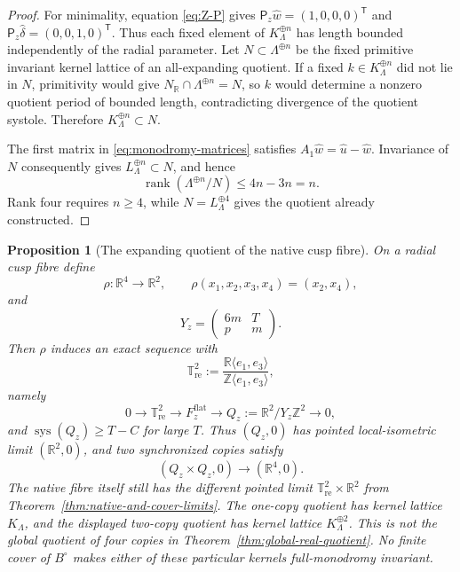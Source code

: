\documentclass[11pt]{article}
\numberwithin{equation}{section}
\newtheorem{proposition}[theorem]{Proposition}
\theoremstyle{definition}
\theoremstyle{remark}
\newcommand{\R}{\mathbb R}
\newcommand{\Z}{\mathbb Z}
\newcommand{\T}{\mathbb T}
\begin{document}
\begin{proof}
For minimality, equation \eqref{eq:Z-P} gives
$\mathsf P_z\widehat w=(1,0,0,0)^{\mathsf T}$ and
$\mathsf P_z\widehat\delta=(0,0,1,0)^{\mathsf T}$.  Thus each fixed element
of $K_\Lambda^{\oplus n}$ has length bounded independently of the radial
parameter.  Let $N\subset\Lambda^{\oplus n}$ be the fixed primitive invariant
kernel lattice of an all-expanding quotient.  If a fixed
$k\in K_\Lambda^{\oplus n}$ did not lie in $N$, primitivity would give
$N_\R\cap\Lambda^{\oplus n}=N$, so $k$ would determine a nonzero quotient
period of bounded length, contradicting divergence of the quotient systole.
Therefore $K_\Lambda^{\oplus n}\subset N$.

The first matrix in \eqref{eq:monodromy-matrices} satisfies
$A_1\widehat w=\widehat u-\widehat w$.  Invariance of $N$ consequently gives
$L_\Lambda^{\oplus n}\subset N$, and hence
\[
 \operatorname{rank}(\Lambda^{\oplus n}/N)
 \le 4n-3n=n.
\]
Rank four requires $n\ge4$, while
$N=L_\Lambda^{\oplus4}$ gives the quotient already constructed.
\end{proof}

\begin{proposition}[The expanding quotient of the native cusp fibre]
\label{prop:native-cusp-quotient}
On a radial cusp fibre define
\[
 \rho:\R^4\longrightarrow\R^2,
 \qquad \rho(x_1,x_2,x_3,x_4)=(x_2,x_4),
\]
and
\begin{equation}\label{eq:native-long-matrix}
 Y_z=\begin{pmatrix}6m&T\\p&m\end{pmatrix}.
\end{equation}
Then $\rho$ induces an exact sequence
with
\[
 \T^2_{\mathrm{re}}
 :=\frac{\R\langle e_1,e_3\rangle}{\Z\langle e_1,e_3\rangle},
\]
namely
\begin{equation}\label{eq:native-cusp-exact-sequence}
 0\longrightarrow\T^2_{\mathrm{re}}\longrightarrow
 F_z^{\mathrm{flat}}\longrightarrow
 Q_z:=\R^2/Y_z\Z^2\longrightarrow0,
\end{equation}
and $\operatorname{sys}(Q_z)\ge T-C$ for large $T$.  Thus $(Q_z,0)$ has
pointed local-isometric limit $(\R^2,0)$, and two synchronized copies satisfy
\begin{equation}\label{eq:native-quotient-two-copy-limit}
 (Q_z\times Q_z,0)\longrightarrow(\R^4,0).
\end{equation}
The native fibre itself still has the different pointed limit
$\T^2_{\mathrm{re}}\times\R^2$ from
Theorem~\ref{thm:native-and-cover-limits}.
The one-copy quotient has kernel lattice $K_\Lambda$, and the displayed
two-copy quotient has kernel lattice $K_\Lambda^{\oplus2}$.  This is not the
global quotient of four copies in Theorem~\ref{thm:global-real-quotient}.
No finite cover of $B^\circ$ makes either of these particular kernels
full-monodromy invariant.
\end{proposition}
\end{document}
